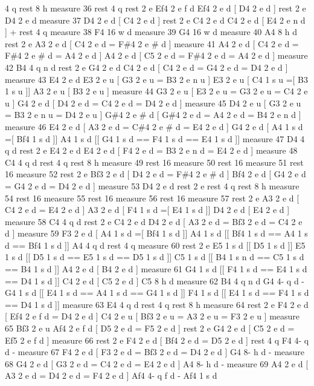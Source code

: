 4 q rest 8 h measure 36 rest 4 q rest 2 e Ef4 2 e f d Ef4 2 e d \mbox{[} D4 2 e d \mbox{]} rest 2 e D4 2 e d measure 37 D4 2 e d \mbox{[} C4 2 e d \mbox{]} rest 2 e C4 2 e d C4 2 e d \mbox{[} E4 2 e n d \mbox{]} + rest 4 q measure 38 F4 16 w d measure 39 G4 16 w d measure 40 A4 8 h d rest 2 e A3 2 e d \mbox{[} C4 2 e d = F\#4 2 e \# d \mbox{]} measure 41 A4 2 e d \mbox{[} C4 2 e d = F\#4 2 e \# d = A4 2 e d \mbox{]} A4 2 e d \mbox{[} C5 2 e d = F\#4 2 e d = A4 2 e d \mbox{]} measure 42 B4 4 q n d rest 2 e G4 2 e d C4 2 e d \mbox{[} C4 2 e d = G4 2 e d = D4 2 e d \mbox{]} measure 43 E4 2 e d E3 2 e u \mbox{[} G3 2 e u = B3 2 e n u \mbox{]} E3 2 e u \mbox{[} C4 1 s u =\mbox{[} B3 1 s u \mbox{]}\mbox{]} A3 2 e u \mbox{[} B3 2 e u \mbox{]} measure 44 G3 2 e u \mbox{[} E3 2 e u = G3 2 e u = C4 2 e u \mbox{]} G4 2 e d \mbox{[} D4 2 e d = C4 2 e d = D4 2 e d \mbox{]} measure 45 D4 2 e u \mbox{[} G3 2 e u = B3 2 e n u = D4 2 e u \mbox{]} G\#4 2 e \# d \mbox{[} G\#4 2 e d = A4 2 e d = B4 2 e n d \mbox{]} measure 46 E4 2 e d \mbox{[} A3 2 e d = C\#4 2 e \# d = E4 2 e d \mbox{]} G4 2 e d \mbox{[} A4 1 s d =\mbox{[} Bf4 1 s d \mbox{]}\mbox{]} A4 1 s d \mbox{[}\mbox{[} G4 1 s d == F4 1 s d == E4 1 s d \mbox{]}\mbox{]} measure 47 D4 4 q d rest 2 e E4 2 e d E4 2 e d \mbox{[} F4 2 e d = B3 2 e n d = E4 2 e d \mbox{]} measure 48 C4 4 q d rest 4 q rest 8 h measure 49 rest 16 measure 50 rest 16 measure 51 rest 16 measure 52 rest 2 e Bf3 2 e d \mbox{[} D4 2 e d = F\#4 2 e \# d \mbox{]} Bf4 2 e d \mbox{[} G4 2 e d = G4 2 e d = D4 2 e d \mbox{]} measure 53 D4 2 e d rest 2 e rest 4 q rest 8 h measure 54 rest 16 measure 55 rest 16 measure 56 rest 16 measure 57 rest 2 e A3 2 e d \mbox{[} C4 2 e d = E4 2 e d \mbox{]} A3 2 e d \mbox{[} F4 1 s d =\mbox{[} E4 1 s d \mbox{]}\mbox{]} D4 2 e d \mbox{[} E4 2 e d \mbox{]} measure 58 C4 4 q d rest 2 e C4 2 e d D4 2 e d \mbox{[} A3 2 e d = Bf3 2 e d = C4 2 e d \mbox{]} measure 59 F3 2 e d \mbox{[} A4 1 s d =\mbox{[} Bf4 1 s d \mbox{]}\mbox{]} A4 1 s d \mbox{[}\mbox{[} Bf4 1 s d == A4 1 s d == Bf4 1 s d \mbox{]}\mbox{]} A4 4 q d rest 4 q measure 60 rest 2 e E5 1 s d \mbox{[}\mbox{[} D5 1 s d \mbox{]}\mbox{]} E5 1 s d \mbox{[}\mbox{[} D5 1 s d == E5 1 s d == D5 1 s d \mbox{]}\mbox{]} C5 1 s d \mbox{[}\mbox{[} B4 1 s n d == C5 1 s d == B4 1 s d \mbox{]}\mbox{]} A4 2 e d \mbox{[} B4 2 e d \mbox{]} measure 61 G4 1 s d \mbox{[}\mbox{[} F4 1 s d == E4 1 s d == D4 1 s d \mbox{]}\mbox{]} C4 2 e d \mbox{[} C5 2 e d \mbox{]} C5 8 h d measure 62 B4 4 q n d G4 4-\/ q d -\/ G4 1 s d \mbox{[}\mbox{[} E4 1 s d == A4 1 s d == G4 1 s d \mbox{]}\mbox{]} F4 1 s d \mbox{[}\mbox{[} E4 1 s d == F4 1 s d == D4 1 s d \mbox{]}\mbox{]} measure 63 E4 4 q d rest 4 q rest 8 h measure 64 rest 2 e F4 2 e d \mbox{[} Ef4 2 e f d = D4 2 e d \mbox{]} C4 2 e u \mbox{[} Bf3 2 e u = A3 2 e u = F3 2 e u \mbox{]} measure 65 Bf3 2 e u Af4 2 e f d \mbox{[} D5 2 e d = F5 2 e d \mbox{]} rest 2 e G4 2 e d \mbox{[} C5 2 e d = Ef5 2 e f d \mbox{]} measure 66 rest 2 e F4 2 e d \mbox{[} Bf4 2 e d = D5 2 e d \mbox{]} rest 4 q F4 4-\/ q d -\/ measure 67 F4 2 e d \mbox{[} F3 2 e d = Bf3 2 e d = D4 2 e d \mbox{]} G4 8-\/ h d -\/ measure 68 G4 2 e d \mbox{[} G3 2 e d = C4 2 e d = E4 2 e d \mbox{]} A4 8-\/ h d -\/ measure 69 A4 2 e d \mbox{[} A3 2 e d = D4 2 e d = F4 2 e d \mbox{]} Af4 4-\/ q f d -\/ Af4 1 s d 